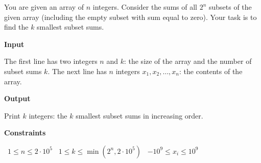 You are given an array of $n$ integers. Consider the sums of all $2^n$ subsets of the given array (including the empty subset with sum equal to zero).
Your task is to find the $k$ smallest subset sums.

\vspace{0.3cm}\noindent\textbf{Input}

The first line has two integers $n$ and $k$: the size of the array and the number of subset sums $k$.
The next line has $n$ integers $x_1, x_2,\dots, x_n$: the contents of the array.

\vspace{0.3cm}\noindent\textbf{Output}

Print $k$ integers: the $k$ smallest subset sums in increasing order.

\vspace{0.3cm}\noindent\textbf{Constraints}

\textbullet\ $1 \le n \le 2 \cdot 10^5$
\textbullet\ $1 \le k \le \min(2^n, 2 \cdot 10^5)$
\textbullet\ $-10^9 \le x_i \le 10^9$